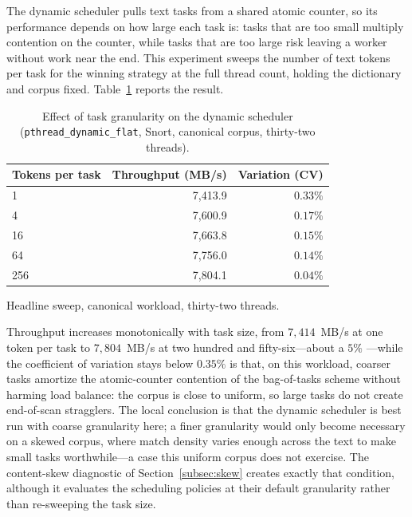 
The dynamic scheduler pulls text tasks from a shared atomic counter, so its
performance depends on how large each task is: tasks that are too small multiply
contention on the counter, while tasks that are too large risk leaving a worker
without work near the end. This experiment sweeps the number of text tokens per
task for the winning strategy at the full thread count, holding the dictionary and
corpus fixed. Table~\ref{tab:granularity} reports the result.

\begin{table}[H]
    \centering
    \caption[Effect of task granularity on the dynamic scheduler]{Effect of task granularity on the dynamic scheduler
    (\texttt{pthread\_dynamic\_flat}, Snort, canonical corpus, thirty-two threads).}
    \label{tab:granularity}
    \small
    \begin{tabular}{@{} l r r @{}}
        \toprule
        \textbf{Tokens per task} & \textbf{Throughput (MB/s)} & \textbf{Variation (CV)} \\
        \midrule
        1   & 7{,}413.9 & $0.33\%$ \\
        4   & 7{,}600.9 & $0.17\%$ \\
        16  & 7{,}663.8 & $0.15\%$ \\
        64  & 7{,}756.0 & $0.14\%$ \\
        256 & 7{,}804.1 & $0.04\%$ \\
        \bottomrule
    \end{tabular}

    {\footnotesize\raggedright Headline sweep, canonical workload, thirty-two threads.\par}
\end{table}

Throughput increases monotonically with task size, from $7{,}414$~MB/s at one
token per task to $7{,}804$~MB/s at two hundred and fifty-six---about a $5\%$
---while the coefficient of variation stays below $0.35\%$
is that, on this workload, coarser tasks amortize the atomic-counter contention of
the bag-of-tasks scheme without harming load balance: the corpus is close to
uniform, so large tasks do not create end-of-scan stragglers. The local conclusion
is that the dynamic scheduler is best run with coarse granularity here; a
finer granularity would only become necessary on a skewed corpus, where match
density varies enough across the text to make small tasks worthwhile---a case this
uniform corpus does not exercise. The content-skew diagnostic of
Section~\ref{subsec:skew} creates exactly that condition, although it evaluates
the scheduling policies at their default granularity rather than re-sweeping the
task size.

